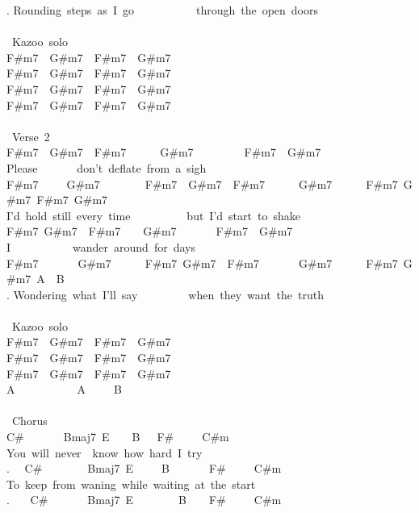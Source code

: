 {. Rounding\ steps\ as\ I\ go\ \ \ \ \ \ \ \ \ \ \ through\ the\ open\ doors\\
\\
\lbrack\ Kazoo\ solo\rbrack\\
F\#m7\ \ G\#m7\ \ F\#m7\ \ G\#m7\\
F\#m7\ \ G\#m7\ \ F\#m7\ \ G\#m7\\
F\#m7\ \ G\#m7\ \ F\#m7\ \ G\#m7\\
F\#m7\ \ G\#m7\ \ F\#m7\ \ G\#m7\\
\\
\lbrack\ Verse\ 2\rbrack\\
F\#m7\ \ G\#m7\ \ F\#m7\ \ \ \ \ \ G\#m7\ \ \ \ \ \ \ \ \ F\#m7\ \ G\#m7\\
Please\ \ \ \ \ \ \ don't\ deflate\ from\ a\ sigh\\
F\#m7\ \ \ \ \ G\#m7\ \ \ \ \ \ \ \ F\#m7\ \ G\#m7\ \ F\#m7\ \ \ \ \ \ G\#m7\ \ \ \ \ \ F\#m7\ G\#m7\ F\#m7\ G\#m7\\
I'd\ hold\ still\ every\ time\ \ \ \ \ \ \ \ \ \ but\ I'd\ start\ to\ shake\\
F\#m7\ G\#m7\ \ F\#m7\ \ \ \ G\#m7\ \ \ \ \ \ \ F\#m7\ \ G\#m7\\
I\ \ \ \ \ \ \ \ \ \ \ wander\ around\ for\ days\\
F\#m7\ \ \ \ \ \ \ G\#m7\ \ \ \ \ \ F\#m7\ G\#m7\ \ F\#m7\ \ \ \ \ \ \ G\#m7\ \ \ \ \ \ F\#m7\ G\#m7\ A\ \ B\\
. Wondering\ what\ I'll\ say\ \ \ \ \ \ \ \ \ when\ they\ want\ the\ truth\\
\\
\lbrack\ Kazoo\ solo\rbrack\\
F\#m7\ \ G\#m7\ \ F\#m7\ \ G\#m7\\
F\#m7\ \ G\#m7\ \ F\#m7\ \ G\#m7\\
F\#m7\ \ G\#m7\ \ F\#m7\ \ G\#m7\\
A\ \ \ \ \ \ \ \ \ \ \ A\ \ \ \ \ B\\
\\
\lbrack\ Chorus\rbrack\\
C\#\ \ \ \ \ \ \ Bmaj7\ E\ \ \ \ B\ \ \ F\#\ \ \ \ \ C\#m\\
You\ will\ never\ \ know\ how\ hard\ I\ try\\
. \ \ C\#\ \ \ \ \ \ \ \ Bmaj7\ E\ \ \ \ \ B\ \ \ \ \ \ \ F\#\ \ \ \ \ C\#m\\
To\ keep\ from\ waning\ while\ waiting\ at\ the\ start\\
. \ \ \ C\#\ \ \ \ \ \ \ Bmaj7\ E\ \ \ \ \ \ \ \ B\ \ \ \ F\#\ \ \ \ \ C\#m\\
}
